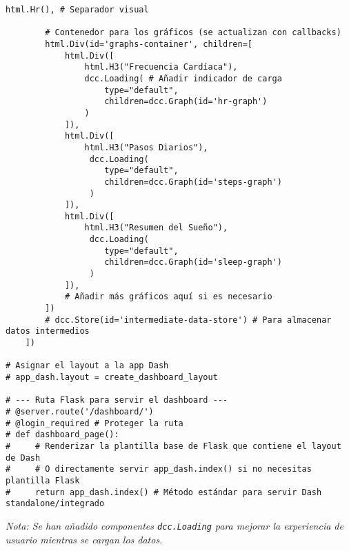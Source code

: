 \begin{lstlisting}[caption={Ejemplo de layout de Dash integrado en Flask.}, label={lst:dash_layout_code}]
        html.Hr(), # Separador visual

        # Contenedor para los gráficos (se actualizan con callbacks)
        html.Div(id='graphs-container', children=[
            html.Div([
                html.H3("Frecuencia Cardíaca"),
                dcc.Loading( # Añadir indicador de carga
                    type="default",
                    children=dcc.Graph(id='hr-graph')
                )
            ]),
            html.Div([
                html.H3("Pasos Diarios"),
                 dcc.Loading(
                    type="default",
                    children=dcc.Graph(id='steps-graph')
                 )
            ]),
            html.Div([
                html.H3("Resumen del Sueño"),
                 dcc.Loading(
                    type="default",
                    children=dcc.Graph(id='sleep-graph')
                 )
            ]),
            # Añadir más gráficos aquí si es necesario
        ])
        # dcc.Store(id='intermediate-data-store') # Para almacenar datos intermedios
    ])

# Asignar el layout a la app Dash
# app_dash.layout = create_dashboard_layout

# --- Ruta Flask para servir el dashboard ---
# @server.route('/dashboard/')
# @login_required # Proteger la ruta
# def dashboard_page():
#     # Renderizar la plantilla base de Flask que contiene el layout de Dash
#     # O directamente servir app_dash.index() si no necesitas plantilla Flask
#     return app_dash.index() # Método estándar para servir Dash standalone/integrado

\end{lstlisting}
\textit{Nota: Se han añadido componentes \texttt{dcc.Loading} para mejorar la experiencia de usuario mientras se cargan los datos.}

